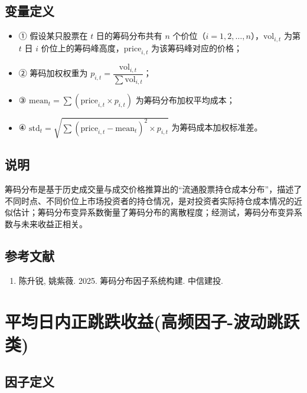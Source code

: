 \documentclass{article}
\begin{document}
\subsection{变量定义}
\begin{itemize}
    \item ① 假设某只股票在 \( t \) 日的筹码分布共有 \( n \) 个价位（\( i = 1, 2, \ldots, n \)），\( \mathrm{vol}_{i,t} \) 为第 \( t \) 日 \( i \) 价位上的筹码峰高度，\( \mathrm{price}_{i,t} \) 为该筹码峰对应的价格；
    \item ② 筹码加权权重为 \( p_{i,t} = \dfrac{\mathrm{vol}_{i,t}}{\sum \mathrm{vol}_{i,t}} \)；
    \item ③ \( \mathrm{mean}_t = \sum (\mathrm{price}_{i,t} \times p_{i,t}) \) 为筹码分布加权平均成本；
    \item ④ \( \mathrm{std}_t = \sqrt{\sum (\mathrm{price}_{i,t} - \mathrm{mean}_t)^2 \times p_{i,t}} \) 为筹码成本加权标准差。
\end{itemize}

\subsection{说明}
筹码分布是基于历史成交量与成交价格推算出的“流通股票持仓成本分布”，描述了不同时点、不同价位上市场投资者的持仓情况，是对投资者实际持仓成本情况的近似估计；筹码分布变异系数衡量了筹码分布的离散程度；经测试，筹码分布变异系数与未来收益正相关。

\subsection{参考文献}
\begin{enumerate}
    \item 陈升锐, 姚紫薇. 2025. 筹码分布因子系统构建. 中信建投.
\end{enumerate}

\section{平均日内正跳跌收益(高频因子-波动跳跃类)}

\subsection{因子定义}
\end{document}
